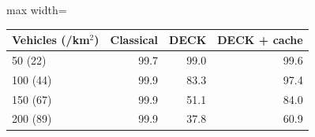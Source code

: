 \begin{adjustbox}{max width=\linewidth}
\begin{tabular}{lrrr}
\toprule
Vehicles (/km$^2$) & Classical & DECK & DECK + cache \\
\midrule
50 (22) & 99.7 & 99.0 & 99.6 \\
100 (44) & 99.9 & 83.3 & 97.4 \\
150 (67) & 99.9 & 51.1 & 84.0 \\
200 (89) & 99.9 & 37.8 & 60.9 \\
\bottomrule
\end{tabular}
\end{adjustbox}
\par{}
